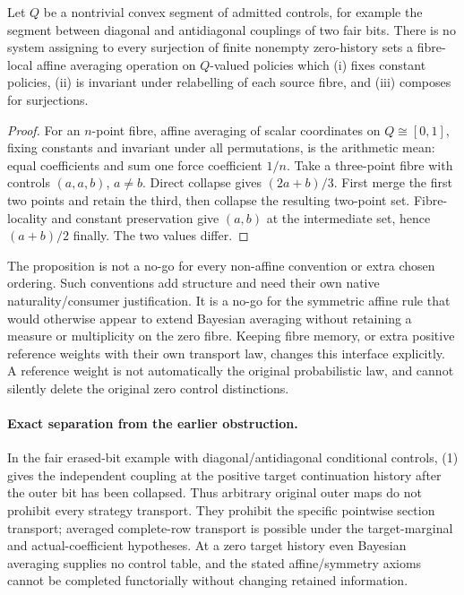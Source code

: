 \documentclass[11pt]{article}
\begin{document}
\begin{proposition}
Let $Q$ be a nontrivial convex segment of admitted controls, for example the segment between diagonal and antidiagonal couplings of two fair bits. There is no system assigning to every surjection of finite nonempty zero-history sets a fibre-local affine averaging operation on $Q$-valued policies which (i) fixes constant policies, (ii) is invariant under relabelling of each source fibre, and (iii) composes for surjections.
\end{proposition}
\begin{proof}
For an $n$-point fibre, affine averaging of scalar coordinates on $Q\cong[0,1]$, fixing constants and invariant under all permutations, is the arithmetic mean: equal coefficients and sum one force coefficient $1/n$. Take a three-point fibre with controls $(a,a,b)$, $a\ne b$. Direct collapse gives $(2a+b)/3$. First merge the first two points and retain the third, then collapse the resulting two-point set. Fibre-locality and constant preservation give $(a,b)$ at the intermediate set, hence $(a+b)/2$ finally. The two values differ.\end{proof}

The proposition is not a no-go for every non-affine convention or extra chosen ordering. Such conventions add structure and need their own native naturality/consumer justification. It is a no-go for the symmetric affine rule that would otherwise appear to extend Bayesian averaging without retaining a measure or multiplicity on the zero fibre. Keeping fibre memory, or extra positive reference weights with their own transport law, changes this interface explicitly. A reference weight is not automatically the original probabilistic law, and cannot silently delete the original zero control distinctions.

\paragraph{Exact separation from the earlier obstruction.} In the fair erased-bit example with diagonal/antidiagonal conditional controls, (1) gives the independent coupling at the positive target continuation history after the outer bit has been collapsed. Thus arbitrary original outer maps do not prohibit every strategy transport. They prohibit the specific pointwise section transport; averaged complete-row transport is possible under the target-marginal and actual-coefficient hypotheses. At a zero target history even Bayesian averaging supplies no control table, and the stated affine/symmetry axioms cannot be completed functorially without changing retained information.
\end{document}
